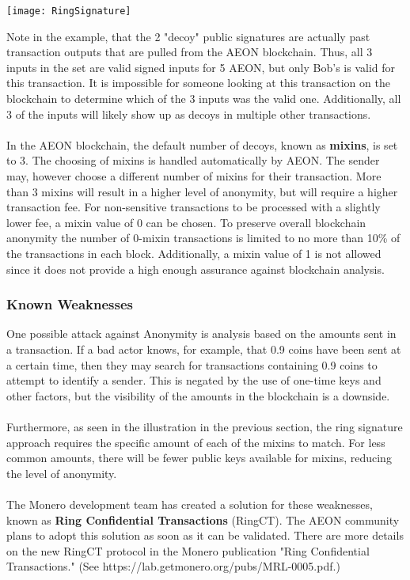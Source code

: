 \begin{center}
	\texttt{[image: RingSignature]}
\end{center}

Note in the example, that the 2 "decoy" public signatures are actually past transaction outputs that are pulled from the AEON blockchain. Thus, all 3 inputs in the set are valid signed inputs for 5 AEON, but only Bob's is valid for this transaction.  It is impossible for someone looking at this transaction on the blockchain to determine which of the 3 inputs was the valid one.  Additionally, all 3 of the inputs will likely show up as decoys in multiple other transactions.\\
\\
In the AEON blockchain, the default number of decoys, known as \textbf{mixins}, is set to 3.  The choosing of mixins is handled automatically by AEON. The sender may, however choose a different number of mixins for their transaction.  More than 3 mixins will result in a higher level of anonymity, but will require a higher transaction fee.  For non-sensitive transactions to be processed with a slightly lower fee, a mixin value of 0 can be chosen.  To preserve overall blockchain anonymity the number of 0-mixin transactions is limited to no more than 10\% of the transactions in each block.  Additionally, a mixin value of 1 is not allowed since it does not provide a high enough assurance against blockchain analysis.

\subsubsection{Known Weaknesses}
One possible attack against Anonymity is analysis based on the amounts sent in a transaction. If a bad actor knows, for example, that 0.9 coins have been sent at a certain time, then they may search for transactions containing 0.9 coins to attempt to identify a sender.  This is negated by the use of one-time keys and other factors, but the visibility of the amounts in the blockchain is a downside.\\
\\
Furthermore, as seen in the illustration in the previous section, the ring signature approach requires the specific amount of each of the mixins to match.  For less common amounts, there will be fewer public keys available for mixins, reducing the level of anonymity.\\
\\
The Monero development team has created a solution for these weaknesses, known as \textbf{Ring Confidential Transactions} (RingCT).  The AEON community plans to adopt this solution as soon as it can be validated.  There are more details on the new RingCT protocol in the Monero publication "Ring Confidential Transactions." (See https://lab.getmonero.org/pubs/MRL-0005.pdf.)

